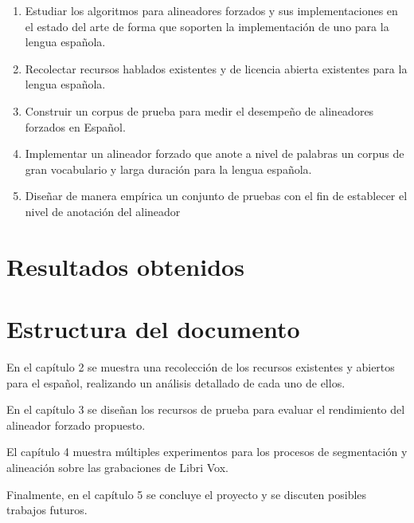 \begin{enumerate}
    \item Estudiar los algoritmos para alineadores forzados y sus implementaciones en el estado del arte de forma que soporten la implementación de uno para la lengua española.
    \item Recolectar recursos hablados existentes y de licencia abierta existentes para la lengua española.
    \item Construir un corpus de prueba para medir el desempeño de alineadores forzados en Español.
    \item Implementar un alineador forzado que anote a nivel de palabras un corpus de gran vocabulario y larga duración para la lengua española.
    \item Diseñar de manera empírica un conjunto de pruebas con el fin de establecer el nivel de anotación del alineador

\end{enumerate}

\section{Resultados obtenidos}

\section{Estructura del documento}

En el capítulo 2 se muestra una recolección de los recursos existentes y abiertos para el español, realizando un análisis detallado de cada uno de ellos.

En el capítulo 3 se diseñan los recursos de prueba para evaluar el rendimiento del alineador forzado propuesto.

El capítulo 4 muestra múltiples experimentos para los procesos de segmentación y alineación sobre las grabaciones de Libri Vox.

Finalmente, en el capítulo 5 se concluye el proyecto y se discuten posibles trabajos futuros.